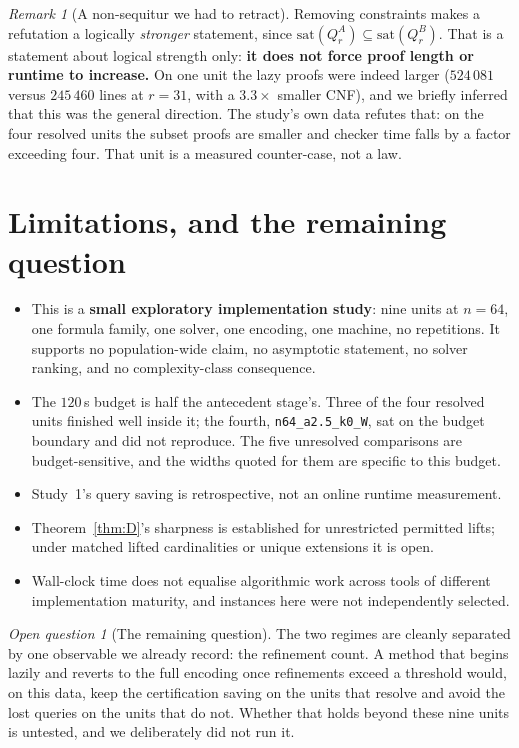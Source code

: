 \documentclass[11pt,a4paper]{article}
\theoremstyle{plain}
\theoremstyle{definition}
\theoremstyle{remark}
\newtheorem{remark}[theorem]{Remark}
\newtheorem{conjecture}[theorem]{Open question}
\begin{document}
\begin{remark}[A non-sequitur we had to retract]
Removing constraints makes a refutation a logically \emph{stronger} statement,
since $\mathrm{sat}(Q_r^A) \subseteq \mathrm{sat}(Q_r^B)$. That is a statement
about logical strength only: \textbf{it does not force proof length or runtime
to increase.} On one unit the lazy proofs were indeed larger ($524\,081$ versus
$245\,460$ lines at $r=31$, with a $3.3\times$ smaller CNF), and we briefly
inferred that this was the general direction. The study's own data refutes that:
on the four resolved units the subset proofs are smaller and checker time falls
by a factor exceeding four. That unit is a measured counter-case, not a law.
\end{remark}

\section{Limitations, and the remaining question}

\begin{itemize}[nosep]
\item This is a \textbf{small exploratory implementation study}: nine units at
      $n = 64$, one formula family, one solver, one encoding, one machine, no
      repetitions. It supports no population-wide claim, no asymptotic
      statement, no solver ranking, and no complexity-class consequence.
\item The $120$\,s budget is half the antecedent stage's. Three of the four
      resolved units finished well inside it; the fourth,
      \texttt{n64\_a2.5\_k0\_W}, sat on the budget boundary and did not
      reproduce. The five unresolved comparisons are budget-sensitive, and the
      widths quoted for them are specific to this budget.
\item Study~1's query saving is retrospective, not an online runtime
      measurement.
\item Theorem~\ref{thm:D}'s sharpness is established for unrestricted permitted
      lifts; under matched lifted cardinalities or unique extensions it is open.
\item Wall-clock time does not equalise algorithmic work across tools of
      different implementation maturity, and instances here were not
      independently selected.
\end{itemize}

\begin{conjecture}[The remaining question]
The two regimes are cleanly separated by one observable we already record: the
refinement count. A method that begins lazily and reverts to the full encoding
once refinements exceed a threshold would, on this data, keep the certification
saving on the units that resolve and avoid the lost queries on the units that do
not. Whether that holds beyond these nine units is untested, and we deliberately
did not run it.
\end{conjecture}
\end{document}
